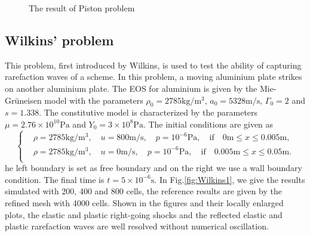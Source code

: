 \documentclass[review]{elsarticle}
\begin{document}
\begin{figure}
      \caption{ The result of Piston problem}
      \label{fig:piston1}
    \end{figure}

\subsection{Wilkins' problem}
This problem, first introduced by Wilkins, is used to test the  ability of capturing rarefaction waves of a scheme. In this problem, a moving aluminium plate strikes on another aluminium plate. The EOS for aluminium is given by the Mie-Gr\"uneisen model with the parameters $\rho_0 = 2785 \text{kg}/\text{m}^3$, $ a_0 = 5328 \text{m} /\text{s}$, $\Gamma_0 =2$ and $s = 1.338$. The constitutive model is characterized by the parameters $\mu = 2.76\times 10^{10} \text{Pa}$ and $Y_0 = 3\times 10^8 \text{Pa}$. The initial conditions are given as
\begin{equation}
 \left\{ \begin{aligned}
   &  \rho = 2785 \text{kg}/\text{m}^3, \quad  u = 800\text{m}/\text{s}, \quad  p = 10^{-6}\text{Pa}, \quad  \text{if} \quad  0\text{m} \le x \le 0.005 \text{m},\\
   &  \rho = 2785 \text{kg}/\text{m}^3, \quad  u = 0\text{m}/\text{s}, \quad  p = 10^{-6}\text{Pa}, \quad  \text{if}  \quad  0.005\text{m} \le x \le 0.05 \text{m}.\\
   \end{aligned}
 \right.
\end{equation}
he left boundary is set as free boundary and on  the right we use a wall boundary condition. The final time is $t =5\times 10^{-6} \text{s}$. In Fig.\ref{fig:Wilkins1}, we give the results  simulated with 200, 400 and 800 cells, the reference results are given by the refined mesh with 4000 cells. Shown in the figures and their locally enlarged plots, the elastic and plastic right-going shocks and the reflected elastic and plastic rarefaction waves are well resolved without numerical oscillation.
\end{document}
